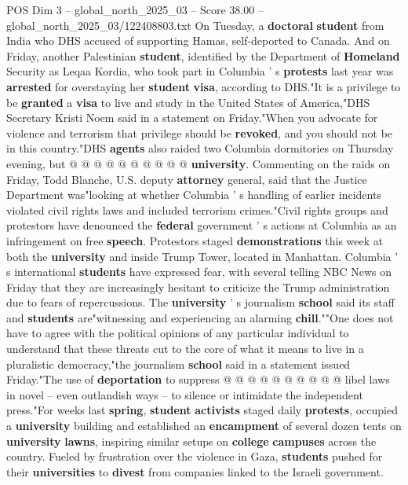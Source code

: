 \begin{textsample}{POS Dim 3 – global\_north\_2025\_03 – Score 38.00 – global\_north\_2025\_03/122408803.txt}
On Tuesday, a \textbf{doctoral} \textbf{student} from India who DHS accused of supporting Hamas, self-deported to Canada.
And on Friday, another Palestinian \textbf{student}, identified by the Department of \textbf{Homeland} Security as Leqaa Kordia, who took part in Columbia ' s \textbf{protests} last year was \textbf{arrested} for overstaying her \textbf{student} \textbf{visa}, according to DHS."It is a privilege to be \textbf{granted} a \textbf{visa} to live and study in the United States of America,"DHS Secretary Kristi Noem said in a statement on Friday."When you advocate for violence and terrorism that privilege should be \textbf{revoked}, and you should not be in this country."DHS \textbf{agents} also raided two Columbia dormitories on Thursday evening, but @ @ @ @ @ @ @ @ @ @ \textbf{university}.
Commenting on the raids on Friday, Todd Blanche, U.S. deputy \textbf{attorney} general, said that the Justice Department was"looking at whether Columbia ' s handling of earlier incidents violated civil rights laws and included terrorism crimes."Civil rights groups and protestors have denounced the \textbf{federal} government ' s actions at Columbia as an infringement on free \textbf{speech}.
Protestors staged \textbf{demonstrations} this week at both the \textbf{university} and inside Trump Tower, located in Manhattan.
Columbia ' s international \textbf{students} have expressed fear, with several telling NBC News on Friday that they are increasingly hesitant to criticize the Trump administration due to fears of repercussions.
The \textbf{university} ' s journalism \textbf{school} said its staff and \textbf{students} are"witnessing and experiencing an alarming \textbf{chill}.""One does not have to agree with the political opinions of any particular individual to understand that these threats cut to the core of what it means to live in a pluralistic democracy,"the journalism \textbf{school} said in a statement issued Friday."The use of \textbf{deportation} to suppress @ @ @ @ @ @ @ @ @ @ libel laws in novel -- even outlandish ways -- to silence or intimidate the independent press."For weeks last \textbf{spring}, \textbf{student} \textbf{activists} staged daily \textbf{protests}, occupied a \textbf{university} building and established an \textbf{encampment} of several dozen tents on \textbf{university} \textbf{lawns}, inspiring similar setups on \textbf{college} \textbf{campuses} across the country.
Fueled by frustration over the violence in Gaza, \textbf{students} pushed for their \textbf{universities} to \textbf{divest} from companies linked to the Israeli government.

\end{textsample}
